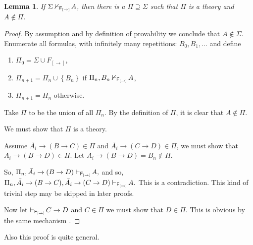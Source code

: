 \documentclass[12pt]{article}
\newtheorem{lem}[thm]{Lemma}
\begin{document}
\begin{lem}
\label{g}
If $ \Sigma\nvdash_{{\sf F_{[\rightarrow]}} }\!A$, then there is a $ \Pi\supseteq \Sigma $  such that $ \Pi $ is a theory and $ A \notin \Pi $.
\end{lem}
\begin{proof} By assumption and by definition of provability we conclude that  $ A \notin \Sigma $. Enumerate all formulas, with infinitely many repetitions: $ B_{0}, B_{1}, ... $ and define
\begin{enumerate}
\item[] $ \Pi_{0}=\Sigma \cup F_{[\rightarrow]}$,

\item[] $ \Pi_{n+1}= \Pi_{n} \cup \left\lbrace B_{n} \right\rbrace  $ if $ \Pi_{n} , B_{n} \nvdash_{{\sf F_{[\rightarrow]}} }\!A $,

\item[]   $ \Pi_{n+1}=  \Pi_{n}  $ otherwise.
 \end{enumerate}
 Take $\Pi $ to be the union of all $ \Pi_{n} $.
By the definition of $ \Pi $, it is clear that $ A \notin \Pi $.

We must show that $\Pi $ is a theory.

\noindent Assume  $\bar{A_{i}}\rightarrow (B\rightarrow C) \in \Pi $ and $\bar{A_{i}}\rightarrow (C\rightarrow D) \in \Pi $, we must show that $\bar{A_{i}}\rightarrow (B\rightarrow D) \in \Pi $.  Let
$\bar{A_{i}}\rightarrow (B\rightarrow D) = B_{n} \notin \Pi $.

So,
$\Pi_{n}, \bar{A_{i}}\rightarrow (B\rightarrow D) \vdash_{{\sf F_{[\rightarrow]}} }\!A,$
and so,
$\Pi_{n}, \bar{A_{i}}\rightarrow (B\rightarrow C), \bar{A_{i}}\rightarrow (C\rightarrow D) \vdash_{{\sf F_{[\rightarrow]}} }\!A.$
This is a contradiction. This kind of trivial step may be skipped in later proofs.

\noindent Now let $\vdash_{{\sf F_{[\rightarrow]}} }\!C\rightarrow D$ and $ C \in \Pi $ we must show that $ D \in \Pi$. This is obvious by the same mechanism .
\end{proof}

Also this proof is quite general.
\end{document}
